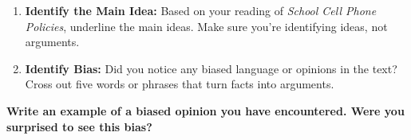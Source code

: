 \documentclass[12pt]{article}
\begin{document}
\begin{tcolorbox}[colframe=black!60, colback=white, 
coltitle=black, colbacktitle=black!15, fonttitle=\bfseries\Large, 
title=Guided Practice, halign title=center, left=10pt, right=10pt, top=10pt, bottom=15pt]
\vspace{0.5cm}

\begin{enumerate}[itemsep=1em] 
    \item \textbf{Identify the Main Idea:} Based on your reading of \textit{School Cell Phone Policies}, underline the main ideas. Make sure you're identifying ideas, not arguments.
    \item \textbf{Identify Bias:} Did you notice any biased language or opinions in the text? Cross out five words or phrases that turn facts into arguments.

\end{enumerate}

\end{tcolorbox}

\begin{tcolorbox}[colframe=black!60, colback=white, 
coltitle=black, colbacktitle=black!15, fonttitle=\bfseries\Large, 
title=Exit Ticket, halign title=center, left=10pt, right=10pt, top=5pt, bottom=15pt]
\textbf{Write an example of a biased opinion you have encountered. Were you surprised to see this bias?}


\vspace{14em}

\end{tcolorbox}
\end{document}
